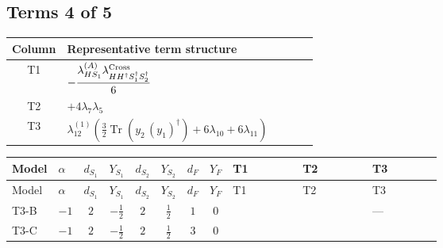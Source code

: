 \documentclass[8pt]{article}
\begin{document}
\begin{landscape}
\subsection*{Terms 4 of 5}
\begin{center}
\begin{tabular}{@{}c >{\raggedright\arraybackslash}p{0.82\linewidth}@{}}
\toprule
Column & Representative term structure \\
\midrule
T1 & \(\displaystyle -\frac{{\lambda_{HS_1}^{(A)}} {\lambda_{H H^\dagger S_1^\dagger S_2^\dagger}^{\rm Cross}}}{6}\) \\
\midrule
T2 & \(\displaystyle +4 {\lambda_{7}} {\lambda_5}\) \\
\midrule
T3 & \(\displaystyle {\lambda_{12}^{(1)}} \left(\frac{3}{2} \operatorname{Tr}\!\left({y_2}\,\left({y_1}\right)^{\dagger}\right)+6 {\lambda_{10}}+6 {\lambda_{11}}\right)\) \\
\midrule
\bottomrule
\end{tabular}
\end{center}
\smallskip
\tiny
\begin{longtable}{@{}llcccccc >{\raggedright\arraybackslash}p{0.21\linewidth} >{\raggedright\arraybackslash}p{0.21\linewidth} >{\raggedright\arraybackslash}p{0.21\linewidth}@{}}
\toprule
Model & $\alpha$ & $d_{S_1}$ & $Y_{S_1}$ & $d_{S_2}$ & $Y_{S_2}$ & $d_F$ & $Y_F$ & T1 & T2 & T3 \\
\midrule
\endfirsthead
\toprule
Model & $\alpha$ & $d_{S_1}$ & $Y_{S_1}$ & $d_{S_2}$ & $Y_{S_2}$ & $d_F$ & $Y_F$ & T1 & T2 & T3 \\
\midrule
\endhead
T3-B & $-1$ & $2$ & $-\frac{1}{2}$ & $2$ & $\frac{1}{2}$ & $1$ & $0$ & \scriptsize\adjustbox{max width=\linewidth}{$\begin{gathered} -\frac{{\lambda_{HS_1}^{(A)}} {\lambda_{H H^\dagger S_1^\dagger S_2^\dagger}^{\rm Cross}}}{6}\end{gathered}$} & \scriptsize\adjustbox{max width=\linewidth}{$\begin{gathered} +4 {\lambda_{7}} {\lambda_5}\end{gathered}$} & --- \\
\midrule
T3-C & $-1$ & $2$ & $-\frac{1}{2}$ & $2$ & $\frac{1}{2}$ & $3$ & $0$ & \scriptsize\adjustbox{max width=\linewidth}{$\begin{gathered} -\frac{{\lambda_{HS_1}^{(A)}} {\lambda_{H H^\dagger S_1^\dagger S_2^\dagger}^{\rm Cross}}}{6}\end{gathered}$} & \scriptsize\adjustbox{max width=\linewidth}{$\begin{gathered} +4 {\lambda_{7}} {\lambda_5}\end{gathered}$} & \scriptsize\adjustbox{max width=\linewidth}{$\begin{gathered} {\lambda_{12}^{(1)}} \left(\frac{3}{2} \operatorname{Tr}\!\left({y_2}\,\left({y_1}\right)^{\dagger}\right)+6 {\lambda_{10}}+6 {\lambda_{11}}\right)\end{gathered}$} \\

\end{longtable}
\end{landscape}
\end{document}
